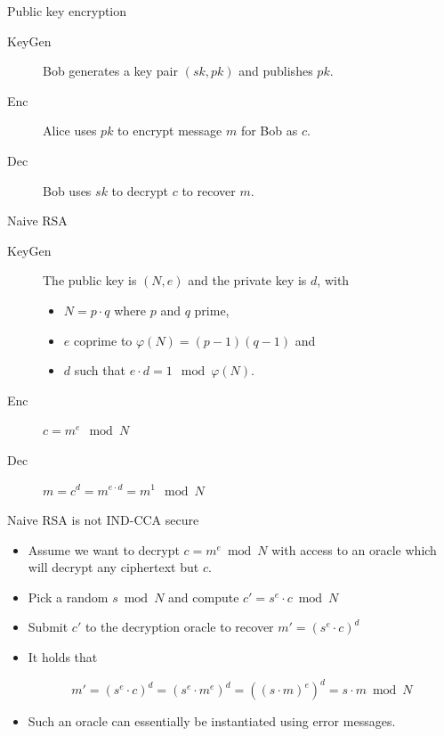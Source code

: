 \documentclass[presentation,smaller]{beamer}
\begin{document}
\begin{frame}[label={sec:orgheadline4}]{Public key encryption}
\begin{description}
\item[{KeyGen}] Bob generates a key pair \alert{\((sk, pk)\)} and publishes \alert{\(pk\)}.

\item[{Enc}] Alice uses \alert{\(pk\)} to encrypt message \alert{\(m\)} for Bob as \alert{\(c\)}.

\item[{Dec}] Bob uses \alert{\(sk\)} to decrypt \alert{\(c\)} to recover \alert{\(m\)}.
\end{description}
\end{frame}

\begin{frame}[label={sec:orgheadline5}]{Naive RSA}
\begin{description}
\item[{KeyGen}] The public key is \((N,e)\) and the private key is \(d\), with

\begin{itemize}
\item \(N = p⋅q\) where \(p\) and \(q\) prime,
\item \(e\) coprime to \(φ(N) = (p-1)(q-1)\) and
\item \(d\) such that \(e⋅ d = 1 \mod{φ(N)}\).
\end{itemize}

\item[{Enc}] \(c = m^e \mod{N}\)

\item[{Dec}] \(m = c^d = m^{e\cdot d} = m^{1} \mod{N}\)
\end{description}
\end{frame}

\begin{frame}[label={sec:orgheadline6}]{Naive RSA is not IND-CCA secure}
\begin{itemize}[<+->]
\item Assume we want to decrypt \(c = m^e \bmod N\) with access to an oracle which will decrypt any ciphertext but \(c\).

\item Pick a random \(s \bmod N\) and compute \(c' = s^e ⋅ c \bmod N\)

\item Submit \(c'\) to the decryption oracle to recover \(m' = {\left(s^e ⋅ c\right)}^d\)

\item It holds that

\[m' = {\left(s^e ⋅ c\right)}^d = {\left(s^e ⋅ m^e\right)}^d = {\left({\left(s⋅m\right)}^e \right)}^d = s⋅m \bmod N\]

\item Such an oracle can essentially be instantiated using error messages. 
\end{itemize}
\end{frame}
\end{document}
